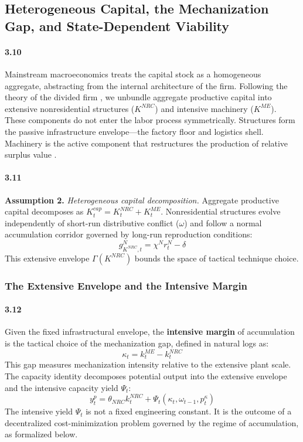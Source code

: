 \subsection{Heterogeneous Capital, the Mechanization Gap,
	and State-Dependent Viability}

\paragraph{3.10}
Mainstream macroeconomics treats the capital stock as a
homogeneous aggregate, abstracting from the internal
architecture of the firm. Following the theory of the
divided firm \citep{Vidal2015, Vidal2019}, we unbundle
aggregate productive capital into extensive nonresidential
structures ($K^{NRC}$) and intensive machinery ($K^{ME}$).
These components do not enter the labor process
symmetrically. Structures form the passive infrastructure
envelope---the factory floor and logistics shell. Machinery
is the active component that restructures the production of
relative surplus value \citep[Vol.~I, Ch.~15]{MarxKVI}.

\paragraph{3.11}
\textbf{Assumption 2.} \textit{Heterogeneous capital
	decomposition.} Aggregate productive capital decomposes as
$K^{cap}_t = K^{NRC}_t + K^{ME}_t$. Nonresidential
structures evolve independently of short-run distributive
conflict ($\omega$) and follow a normal accumulation
corridor governed by long-run reproduction conditions:
\begin{equation}
	g_{K^{NRC}, t}^N = \chi^N r^N_t - \delta
	\label{eq:32:gKNRC}
\end{equation}
This extensive envelope $\Gamma(K^{NRC})$ bounds the space
of tactical technique choice.

\subsubsection{The Extensive Envelope and the Intensive
	Margin}

\paragraph{3.12}
Given the fixed infrastructural envelope, the
\textbf{intensive margin} of accumulation is the tactical
choice of the mechanization gap, defined in natural logs as:
\begin{equation}
	\kappa_t = k^{ME}_t - k^{NRC}_t
	\label{eq:32:kappa_def}
\end{equation}
This gap measures mechanization intensity relative to the
extensive plant scale. The capacity identity decomposes
potential output into the extensive envelope and the
intensive capacity yield $\Psi_t$:
\begin{equation}
	y^p_t = \theta_{NRC} k^{NRC}_t
	+ \Psi_t(\kappa_t, \omega_{t-1}, p^\kappa_t)
	\label{eq:32:capacity_decomp}
\end{equation}
The intensive yield $\Psi_t$ is not a fixed engineering
constant. It is the outcome of a decentralized
cost-minimization problem governed by the regime of
accumulation, as formalized below.

